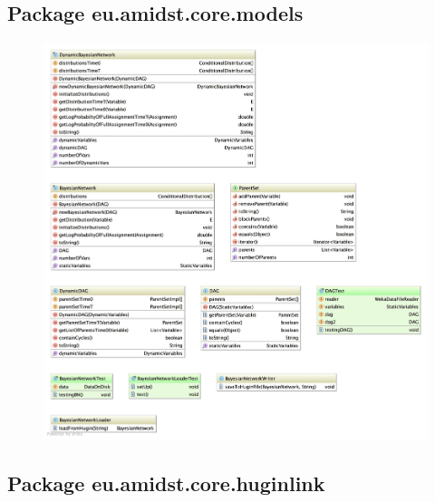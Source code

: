 \subsection{Package eu.amidst.core.models}
\begin{figure}[H]
  \centering
    \includegraphics[width=\textwidth]{ClassDiagrams/core_models.jpg}
\end{figure}

\subsection{Package eu.amidst.core.huginlink}

